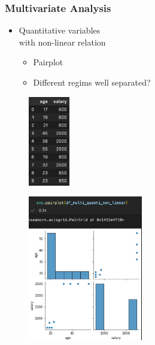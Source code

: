 \begin{frame}\frametitle{Multivariate Analysis}
   \begin{minipage}{0.48\linewidth}
      \begin{itemize}
         \item Quantitative variables\\
               with non-linear relation
         \begin{itemize}
            \item Pairplot
            \item Different regims well separated?
         \end{itemize}
      \end{itemize}
      \vspace{.5cm}
      \begin{figure}[H]
         \includegraphics[width=1.8cm]{../images/illustrations/pattern_multivariate_quantitative_non_linear_df.png}
      \end{figure}
   \end{minipage}
   \begin{minipage}{0.48\linewidth}
      \begin{figure}[H]
         \includegraphics[width=5cm]{../images/illustrations/pattern_multivariate_quantitative_non_linear_pairplot.png}
      \end{figure}
   \end{minipage}
\end{frame}


